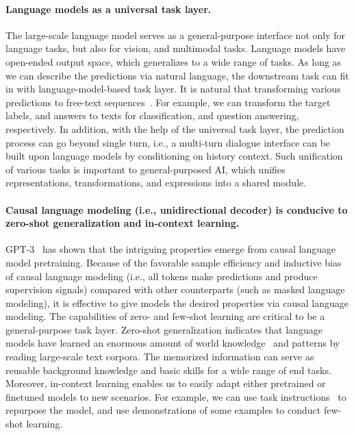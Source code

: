 \documentclass{article}
\theoremstyle{plain}
\theoremstyle{definition}
\theoremstyle{remark}
\begin{document}
\paragraph{Language models as a universal task layer.}
The large-scale language model serves as a general-purpose interface not only for language tasks, but also for vision, and multimodal tasks.
Language models have open-ended output space, which generalizes to a wide range of tasks.
As long as we can describe the predictions via natural language, the downstream task can fit in with language-model-based task layer.
It is natural that transforming various predictions to free-text sequences~\citep{t5}.
For example, we can transform the target labels, and answers to texts for classification, and question answering, respectively.
In addition, with the help of the universal task layer, the prediction process can go beyond single turn, i.e., a multi-turn dialogue interface can be built upon language models by conditioning on history context.
Such unification of various tasks is important to general-purposed AI, which unifies representations, transformations, and expressions into a shared module.

\paragraph{Causal language modeling (i.e., unidirectional decoder) is conducive to zero-shot generalization and in-context learning.}
GPT-3~\citep{gpt3} has shown that the intriguing properties emerge from causal language model pretraining.
Because of the favorable sample efficiency and inductive bias~\citep{what:lm:objective} of causal language modeling (i.e., all tokens make predictions and produce supervision signals) compared with other counterparts (such as masked language modeling), it is effective to give models the desired properties via causal language modeling.
The capabilities of zero- and few-shot learning are critical to be a general-purpose task layer.
Zero-shot generalization indicates that language models have learned an enormous amount of world knowledge~\citep{knowledgeneurons} and patterns by reading large-scale text corpora.
The memorized information can serve as reusable background knowledge and basic skills for a wide range of end tasks.
Moreover, in-context learning enables us to easily adapt either pretrained or finetuned models to new scenarios.
For example, we can use task instructions~\citep{instructgpt} to repurpose the model, and use demonstrations of some examples to conduct few-shot learning.
\end{document}
